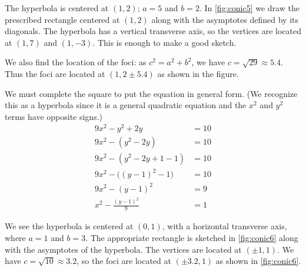 {The hyperbola is centered at $(1,2)$; $a=5$ and $b=2$.
In \autoref{fig:conic5} we draw the prescribed rectangle centered at $(1,2)$ along with the asymptotes defined by its diagonals. The hyperbola has a vertical transverse axis, so the vertices are located at $(1,7)$ and $(1,-3)$. This is enough to make a good sketch.

We also find the location of the foci: as $c^2= a^2+b^2$, we have $c=\sqrt{29}\approx 5.4$. Thus the foci are located at $(1,2\pm 5.4)$ as shown in the figure.}

{We must complete the square to put the equation in general form. (We recognize this as a hyperbola since it is a general quadratic equation and the $x^2$ and $y^2$ terms have opposite signs.)
\begin{align*}
	9x^2-y^2+2y &=10\\
	9x^2- (y^2-2y) &= 10\\
	9x^2 - (y^2-2y+1-1) &= 10\\
	9x^2 -\big((y-1)^2-1\big) &= 10\\
	9x^2 - (y-1)^2 &= 9\\
	x^2 - \frac{(y-1)^2}{9} &=1
\end{align*}

We see the hyperbola is centered at $(0,1)$, with a horizontal transverse axis, where $a=1$ and $b=3$. The appropriate rectangle is sketched in \autoref{fig:conic6} along with the asymptotes of the hyperbola. The vertices are located at $(\pm 1,1)$. We have $c=\sqrt{10}\approx 3.2$, so the foci are located at $(\pm 3.2,1)$ as shown in \autoref{fig:conic6}.}

